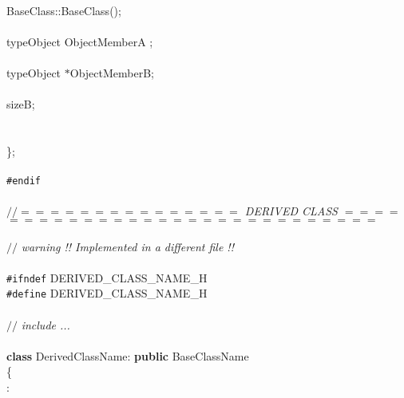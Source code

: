 \begin{flushleft}
\mbox{}\\
\hspace*{2\indentation}BaseClass::BaseClass();\mbox{}\\
\mbox{}\\
\hspace*{2\indentation}typeObject ObjectMemberA ;\mbox{}\\
\mbox{}\\
\hspace*{2\indentation}typeObject $\ast$ObjectMemberB;\mbox{}\\
\mbox{}\\
\hspace*{2\indentation}{\bf int} sizeB; \mbox{}\\
\hspace*{2\indentation}\mbox{}\\
\mbox{}\\
\};\mbox{}\\
\mbox{}\\
{\tt \#endif} \mbox{}\\
\mbox{}\\
{$//$\it{}$=$$=$$=$$=$$=$$=$$=$$=$$=$$=$$=$$=$$=$$=$$=$ DERIVED CLASS $=$$=$$=$$=$$=$$=$$=$$=$$=$$=$$=$$=$$=$$=$$=$$=$$=$$=$$=$$=$$=$$=$$=$$=$$=$$=$$=$$=$$=${}\mbox{}\\
}\mbox{}\\
{$//$\it{} warning !! Implemented in a different file !!{}\mbox{}\\
}\mbox{}\\
{\tt \#ifndef} DERIVED\_CLASS\_NAME\_H\mbox{}\\
{\tt \#define} DERIVED\_CLASS\_NAME\_H\mbox{}\\
\mbox{}\\
{$//$\it{} include ...{}\mbox{}\\
}\mbox{}\\
{\bf class} DerivedClassName: {\bf public} BaseClassName\mbox{}\\
\{\mbox{}\\
\hspace*{1\indentation}{\bf public}:\mbox{}\\

\end{flushleft}

